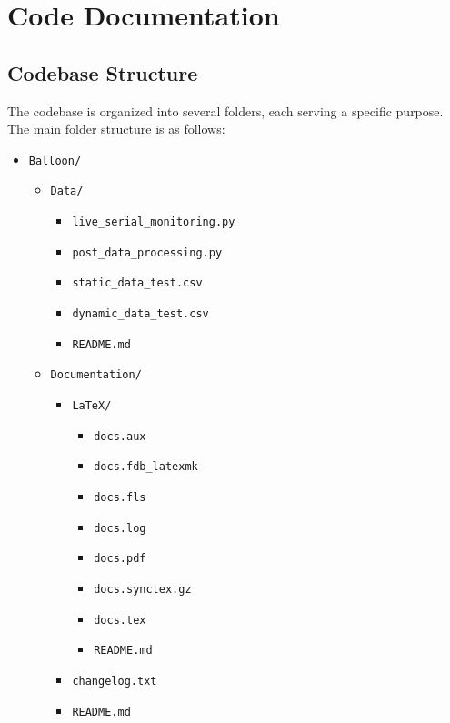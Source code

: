 \documentclass[12pt]{report}
\begin{document}
\chapter{Code Documentation}

\section{Codebase Structure}
The codebase is organized into several folders, each serving a specific purpose. The main folder structure is as follows:
\begin{itemize}
    \item \texttt{Balloon/}
    \begin{itemize}
      \item \texttt{Data/}
      \begin{itemize}
        \item \texttt{live\_serial\_monitoring.py}
        \item \texttt{post\_data\_processing.py}
        \item \texttt{static\_data\_test.csv}
        \item \texttt{dynamic\_data\_test.csv}
        \item \texttt{README.md}
      \end{itemize}
      \item \texttt{Documentation/}
      \begin{itemize}
        \item \texttt{LaTeX/}
        \begin{itemize}
          \item \texttt{docs.aux}
          \item \texttt{docs.fdb\_latexmk}
          \item \texttt{docs.fls}
          \item \texttt{docs.log}
          \item \texttt{docs.pdf}
          \item \texttt{docs.synctex.gz}
          \item \texttt{docs.tex}
          \item \texttt{README.md}
        \end{itemize}
        \item \texttt{changelog.txt}
        \item \texttt{README.md}

\end{itemize}
\end{itemize}
\end{itemize}
\end{document}
